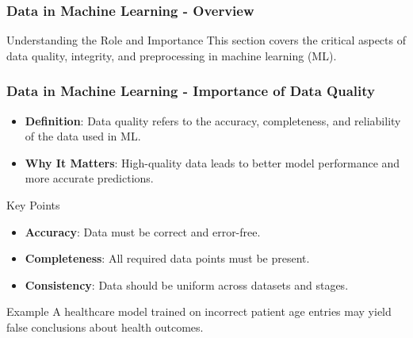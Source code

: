 \documentclass{beamer}
\begin{document}
\begin{frame}[fragile]
    \frametitle{Data in Machine Learning - Overview}
    \begin{block}{Understanding the Role and Importance}
        This section covers the critical aspects of data quality, integrity, and preprocessing in machine learning (ML).
    \end{block}
\end{frame}

\begin{frame}[fragile]
    \frametitle{Data in Machine Learning - Importance of Data Quality}
    \begin{itemize}
        \item \textbf{Definition}: Data quality refers to the accuracy, completeness, and reliability of the data used in ML.
        \item \textbf{Why It Matters}: High-quality data leads to better model performance and more accurate predictions.
    \end{itemize}
    \begin{block}{Key Points}
        \begin{itemize}
            \item \textbf{Accuracy}: Data must be correct and error-free.
            \item \textbf{Completeness}: All required data points must be present.
            \item \textbf{Consistency}: Data should be uniform across datasets and stages.
        \end{itemize}
    \end{block}
    \begin{exampleblock}{Example}
        A healthcare model trained on incorrect patient age entries may yield false conclusions about health outcomes.
    \end{exampleblock}
\end{frame}
\end{document}
